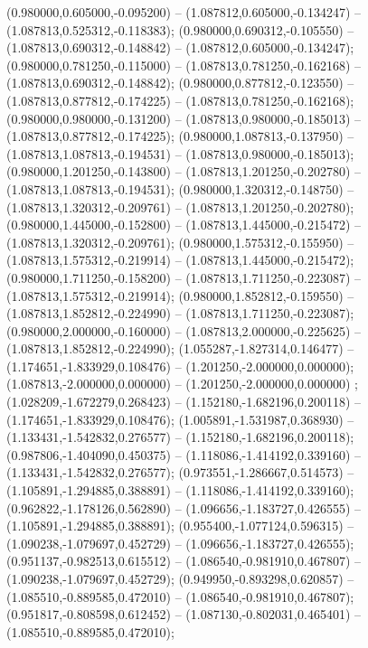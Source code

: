  (0.980000,0.605000,-0.095200) -- (1.087812,0.605000,-0.134247) -- (1.087813,0.525312,-0.118383);
 (0.980000,0.690312,-0.105550) -- (1.087813,0.690312,-0.148842) -- (1.087812,0.605000,-0.134247);
 (0.980000,0.781250,-0.115000) -- (1.087813,0.781250,-0.162168) -- (1.087813,0.690312,-0.148842);
 (0.980000,0.877812,-0.123550) -- (1.087813,0.877812,-0.174225) -- (1.087813,0.781250,-0.162168);
 (0.980000,0.980000,-0.131200) -- (1.087813,0.980000,-0.185013) -- (1.087813,0.877812,-0.174225);
 (0.980000,1.087813,-0.137950) -- (1.087813,1.087813,-0.194531) -- (1.087813,0.980000,-0.185013);
 (0.980000,1.201250,-0.143800) -- (1.087813,1.201250,-0.202780) -- (1.087813,1.087813,-0.194531);
 (0.980000,1.320312,-0.148750) -- (1.087813,1.320312,-0.209761) -- (1.087813,1.201250,-0.202780);
 (0.980000,1.445000,-0.152800) -- (1.087813,1.445000,-0.215472) -- (1.087813,1.320312,-0.209761);
 (0.980000,1.575312,-0.155950) -- (1.087813,1.575312,-0.219914) -- (1.087813,1.445000,-0.215472);
 (0.980000,1.711250,-0.158200) -- (1.087813,1.711250,-0.223087) -- (1.087813,1.575312,-0.219914);
 (0.980000,1.852812,-0.159550) -- (1.087813,1.852812,-0.224990) -- (1.087813,1.711250,-0.223087);
 (0.980000,2.000000,-0.160000) -- (1.087813,2.000000,-0.225625) -- (1.087813,1.852812,-0.224990);
 (1.055287,-1.827314,0.146477) -- (1.174651,-1.833929,0.108476) -- (1.201250,-2.000000,0.000000);
 (1.087813,-2.000000,0.000000) -- (1.201250,-2.000000,0.000000) ;
 (1.028209,-1.672279,0.268423) -- (1.152180,-1.682196,0.200118) -- (1.174651,-1.833929,0.108476);
 (1.005891,-1.531987,0.368930) -- (1.133431,-1.542832,0.276577) -- (1.152180,-1.682196,0.200118);
 (0.987806,-1.404090,0.450375) -- (1.118086,-1.414192,0.339160) -- (1.133431,-1.542832,0.276577);
 (0.973551,-1.286667,0.514573) -- (1.105891,-1.294885,0.388891) -- (1.118086,-1.414192,0.339160);
 (0.962822,-1.178126,0.562890) -- (1.096656,-1.183727,0.426555) -- (1.105891,-1.294885,0.388891);
 (0.955400,-1.077124,0.596315) -- (1.090238,-1.079697,0.452729) -- (1.096656,-1.183727,0.426555);
 (0.951137,-0.982513,0.615512) -- (1.086540,-0.981910,0.467807) -- (1.090238,-1.079697,0.452729);
 (0.949950,-0.893298,0.620857) -- (1.085510,-0.889585,0.472010) -- (1.086540,-0.981910,0.467807);
 (0.951817,-0.808598,0.612452) -- (1.087130,-0.802031,0.465401) -- (1.085510,-0.889585,0.472010);

